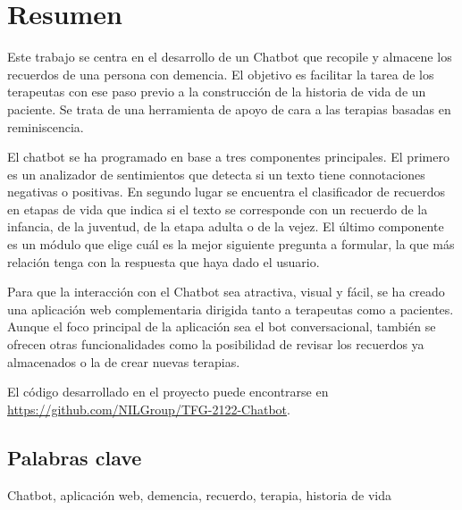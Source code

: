 \chapter*{Resumen}

Este trabajo se centra en el desarrollo de un Chatbot que recopile y almacene los recuerdos de una persona con demencia. El objetivo es facilitar la tarea de los terapeutas con ese paso previo a la construcción de la historia de vida de un paciente. Se trata de una herramienta de apoyo de cara a las terapias basadas en reminiscencia. 

 
El chatbot se ha programado en base a tres componentes principales. El primero es un analizador de sentimientos que detecta si un texto tiene connotaciones negativas o positivas. En segundo lugar se encuentra el clasificador de recuerdos en etapas de vida que indica si el texto se corresponde con un recuerdo de la infancia, de la juventud, de la etapa adulta o de la vejez. El último componente es un módulo que elige cuál es la mejor siguiente pregunta a formular, la que más relación tenga con la respuesta que haya dado el usuario. 

Para que la interacción con el Chatbot sea atractiva, visual y fácil, se ha creado una aplicación web complementaria dirigida tanto a terapeutas como a pacientes. Aunque el foco principal de la aplicación sea el bot conversacional, también se ofrecen otras funcionalidades como la posibilidad de revisar los recuerdos ya almacenados o la de crear nuevas terapias.

El código desarrollado en el proyecto puede
encontrarse en \url{https://github.com/NILGroup/TFG-2122-Chatbot}. 


\section*{Palabras clave}
   
Chatbot, aplicación web, demencia, recuerdo, terapia, historia de vida

   


